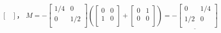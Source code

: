\begin{enumerate}[(a)]
\begin{math}
\begin{bmatrix}
      \end{bmatrix}        
  \end{math}，
  \begin{math}
    M= -
    \begin{bmatrix}
      1/4 & 0 \\
      0 & 1/2 \\
    \end{bmatrix}
    \left(
      \begin{bmatrix}
        0 & 0 \\
        1 & 0 \\
      \end{bmatrix}
      +
      \begin{bmatrix}
        0 & 1 \\
        0 & 0 \\
      \end{bmatrix}
    \right)
    = \underline{-
    \begin{bmatrix}
      0 & 1/4 \\
      1/2 & 0 \\
    \end{bmatrix} 
    }
  \end{math}


\end{enumerate}
